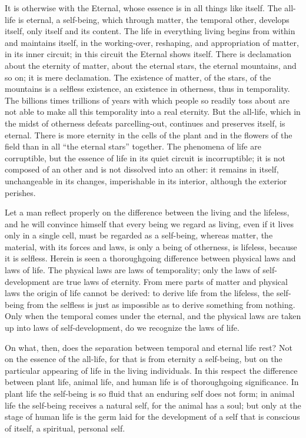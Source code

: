 \documentclass[12pt,a4paper,openany]{book}
\newcommand{\opage}[1]{\marginnote{\footnotesize\textit{[#1]}}}
\begin{document}
It is otherwise with the Eternal, whose essence is in all things like
itself. The all-life is eternal, a self-being, which through
matter, the temporal other, develops itself, only itself
and its content. The life in everything living begins from within and
maintains itself, in the working-over, reshaping, and
appropriation of matter, in its inner circuit; in this circuit
the Eternal shows itself. There is declamation about the eternity of matter, about the
eternal stars, the eternal mountains, and so on; it is mere declamation.
The existence of matter, of the stars, of the mountains is
a selfless existence, an existence in otherness, thus in
temporality. The billions times trillions of years with which
people so readily toss about are not able to make all this
temporality into a real eternity. But the all-life, which
in the midst of otherness defeats parcelling-out, continues and
preserves itself, is eternal. There is more eternity in the cells of the plant and in
the flowers of the field than in all ``the eternal
stars'' together. The phenomena of life are corruptible, but
the essence of life in its quiet circuit is incorruptible; it is not
composed of an other and is not dissolved into an
other: it remains in itself, unchangeable in its changes,
imperishable in its interior, although the exterior
perishes.

\setcounter{footnote}{0}%
\opage{68}Let a man reflect properly on the difference between the living
and the lifeless, and he will convince himself that
every being we regard as living, even if it lives
only in a single cell, must be regarded as a self-being,
whereas matter, the material, with its forces and laws,
is only a being of otherness, is lifeless, because it is
selfless. Herein is seen a thoroughgoing difference between physical
laws and laws of life. The physical laws are laws of temporality;
only the laws of self-development are true laws of eternity. From mere
parts of matter and physical laws the origin of life cannot be derived:
to derive life from the lifeless, the self-being from the
selfless is just as impossible as to derive something from nothing.
Only when the temporal comes under the eternal, and the
physical laws are taken up into laws of self-development, do
we recognize the laws of life.

On what, then, does the separation between temporal and
eternal life rest? Not on the essence of the all-life, for that is from eternity
a self-being, but on the particular appearing of life in the
living individuals. In this respect the difference between
plant life, animal life, and human life is of thoroughgoing significance.
In plant life the self-being is so fluid that an
enduring self does not form; in animal life the self-being receives
a natural self, for the animal has a soul; but
only at the stage of human life is the germ laid for the development
of a self that is conscious of itself, a spiritual, personal self.
\end{document}
